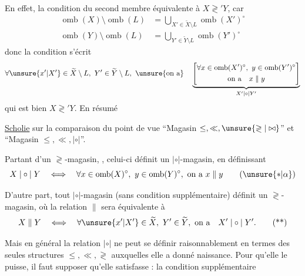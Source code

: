 En effet, la condition du second membre  équivalente à $X\gtrless'Y$, car
\[
\begin{aligned}
\operatorname{omb}(X)\setminus\operatorname{omb}(L)&=\bigcup_{X'\in\widetilde X\setminus L}\operatorname{omb}(X')^{\circ}\\
\operatorname{omb}(Y)\setminus\operatorname{omb}(L)&=\bigcup_{Y'\in\widetilde Y\setminus L}\operatorname{omb}(Y')^{\circ}
\end{aligned}
\]
donc la condition  s'écrit 
\[
\forall\unsure{x'|X'}\in\widetilde X\setminus L,\ Y'\in\widetilde Y\setminus L,\ \unsure{\text{on a}}\quad
\underbrace{\left[\begin{gathered}
\forall x\in\operatorname{omb}(X')^{\circ},\ y\in\operatorname{omb}(Y')^{\circ}\\
\text{on a}\quad x\parallel y
\end{gathered}\right]}_{X'\mathrel{|\circ|}Y'}
\]
qui est bien $X\gtrless'Y$.
En résumé

\uline{Scholie} sur la comparaison du point de vue ``Magasin $\leq,\ll,\unsure{\gtrless|\bowtie}$'' et ``Magasin $\leq,\ll,\mathrel{|\circ|}$''.

Partant d'un $\gtrless$-magasin, , celui-ci définit un $\mathrel{|\circ|}$-magasin, en définissant
\[
X\mathrel{|\circ|}Y\quad\Longleftrightarrow\quad\forall x\in\operatorname{omb}(X)^{\circ},\ y\in\operatorname{omb}(Y)^{\circ},\ \text{on a }x\parallel y
\tag*{($\unsure{*|\alpha}$)}
\]

D'autre part, tout $\mathrel{|\circ|}$-magasin (sans condition supplémentaire) définit un $\gtrless$-magasin, où  la relation $\parallel$ sera équivalente à
\[
X\parallel Y\quad\Longleftrightarrow\quad\forall\unsure{x'|X'}\in\widetilde X,\ Y'\in\widetilde Y,\ \text{on a}\quad X'\mathrel{|\circ|}Y'.
\tag*{(**)}
\]

Mais en général  la relation $\mathrel{|\circ|}$ ne peut se définir raisonnablement en termes des seules structures $\leq,\ll,\gtrless$ auxquelles elle a donné naissance. Pour qu'elle le puisse, il faut supposer qu'elle satisfasse : la condition supplémentaire

